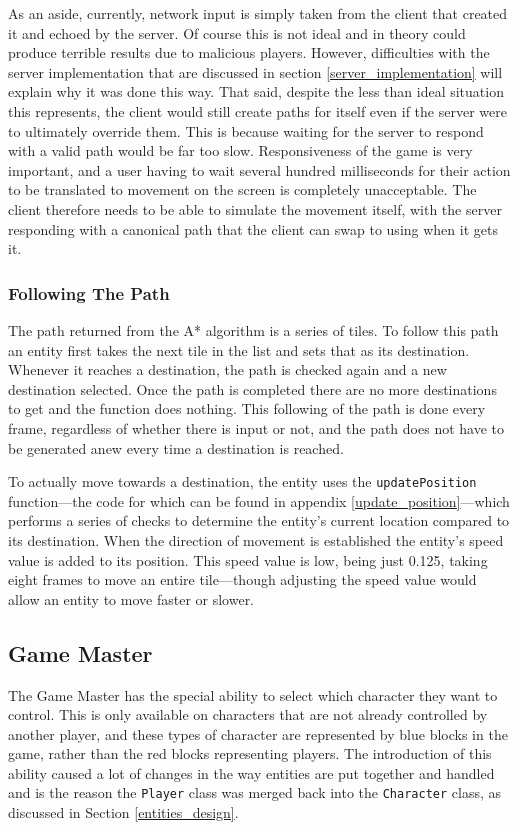 As an aside, currently, network input is simply taken from the client that created it and echoed by the server. Of course this is not ideal and in theory could produce terrible results due to malicious players. However, difficulties with the server implementation that are discussed in section \ref{server_implementation} will explain why it was done this way. That said, despite the less than ideal situation this represents, the client would still create paths for itself even if the server were to ultimately override them. This is because waiting for the server to respond with a valid path would be far too slow. Responsiveness of the game is very important, and a user having to wait several hundred milliseconds for their action to be translated to movement on the screen is completely unacceptable. The client therefore needs to be able to simulate the movement itself, with the server responding with a canonical path that the client can swap to using when it gets it.

\subsubsection{Following The Path}
The path returned from the A* algorithm is a series of tiles. To follow this path an entity first takes the next tile in the list and sets that as its destination. Whenever it reaches a destination, the path is checked again and a new destination selected. Once the path is completed there are no more destinations to get and the function does nothing. This following of the path is done every frame, regardless of whether there is input or not, and the path does not have to be generated anew every time a destination is reached.

To actually move towards a destination, the entity uses the \texttt{updatePosition} function---the code for which can be found in appendix \ref{update_position}---which performs a series of checks to determine the entity's current location compared to its destination. When the direction of movement is established the entity's speed value is added to its position. This speed value is low, being just 0.125, taking eight frames to move an entire tile---though adjusting the speed value would allow an entity to move faster or slower.

\subsection{Game Master}
The Game Master has the special ability to select which character they want to control. This is only available on characters that are not already controlled by another player, and these types of character are represented by blue blocks in the game, rather than the red blocks representing players. The introduction of this ability caused a lot of changes in the way entities are put together and handled and is the reason the \texttt{Player} class was merged back into the \texttt{Character} class, as discussed in Section \ref{entities_design}.

